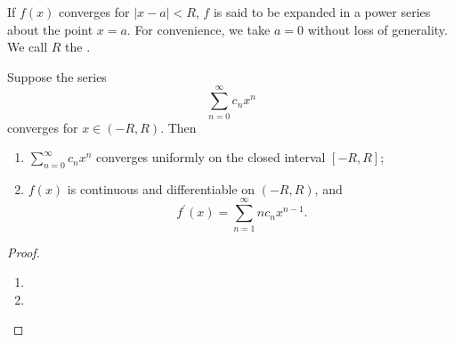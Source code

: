 If $f(x)$ converges for $|x-a|<R$, $f$ is said to be expanded in a power series about the point $x=a$. For convenience, we take $a=0$ without loss of generality. We call $R$ the .

\begin{theorem}
Suppose the series 
\[ \sum_{n=0}^\infty c_nx^n \]
converges for $x\in(-R,R)$. Then
\begin{enumerate}[label=(\arabic*)]
\item $\sum_{n=0}^\infty c_nx^n$ converges uniformly on the closed interval $[-R,R]$;
\item $f(x)$ is continuous and differentiable on $(-R,R)$, and 
\[ f^\prime(x)=\sum_{n=1}^\infty nc_nx^{n-1}. \]
\end{enumerate}
\end{theorem}

\begin{proof} \
\begin{enumerate}[label=(\roman*)]
\item 
\item 
\end{enumerate}
\end{proof}